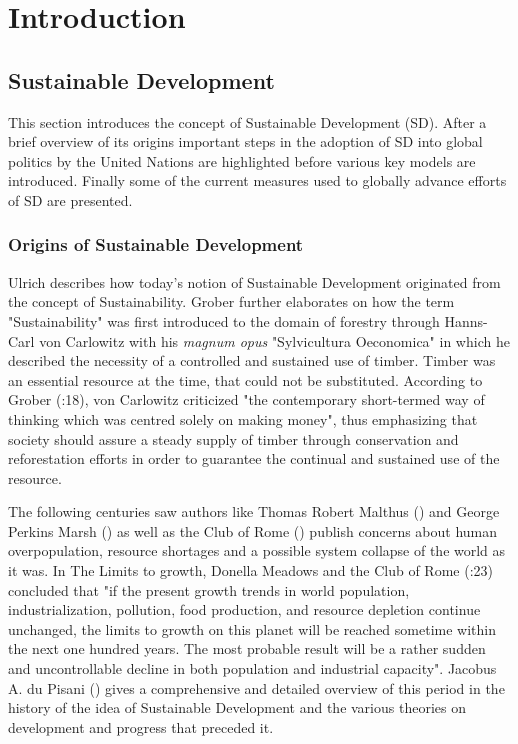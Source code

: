 	
	\section{Introduction}
		
		\subsection{Sustainable Development}
    		This section introduces the concept of Sustainable Development (SD). After a brief overview of its origins important steps in the adoption of SD into global politics by the United Nations are highlighted before various key models are introduced. Finally some of the current measures used to globally advance efforts of SD are presented.\bigskip
		
		    \subsubsection{Origins of Sustainable Development}
		        Ulrich \citet{grober2007} describes how today's notion of Sustainable Development originated from the concept of Sustainability. Grober further elaborates on how the term "Sustainability" was first introduced to the domain of forestry through Hanns-Carl von Carlowitz \citet{voncarlowitz1732} with his \textit{magnum opus} "Sylvicultura Oeconomica" in which he described the necessity of a controlled and sustained use of timber. Timber was an essential resource at the time, that could not be substituted. According to Grober (\citeyear{grober2007}:18), von Carlowitz criticized "the contemporary short-termed way of thinking which was centred solely on making money", thus emphasizing that society should assure a steady supply of timber through conservation and reforestation efforts in order to guarantee the continual and sustained use of the resource.
		        \medskip
		        
		        The following centuries saw authors like Thomas Robert Malthus (\citeyear{malthus1926}) and George Perkins Marsh (\citeyear{marsh1965}) as well as the Club of Rome (\citeyear{meadows1972a}) publish concerns about human overpopulation, resource shortages and a possible system collapse of the world as it was. In The Limits to growth, Donella Meadows and the Club of Rome (\citeyear{meadows1972a}:23) concluded that "if the present growth trends in world population, industrialization, pollution, food production, and resource depletion continue unchanged, the limits to growth on this planet will be reached sometime within the next one hundred years. The most probable result will be a rather sudden and uncontrollable decline in both population and industrial capacity". Jacobus A. du Pisani (\citeyear{dupisani2006}) gives a comprehensive and detailed overview of this period in the history of the idea of Sustainable Development and the various theories on development and progress that preceded it.
		        \medskip
		        
